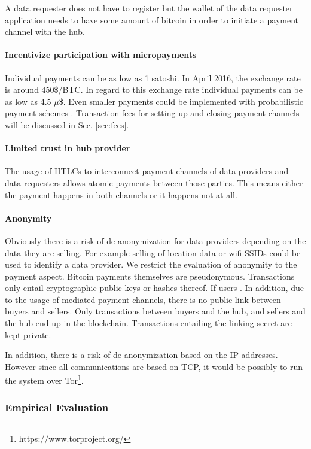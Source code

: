 A data requester does not have to register but the wallet of the data requester application needs to have some amount of bitcoin in order to initiate a payment channel with the hub.

\paragraph{Incentivize participation with micropayments}
Individual payments can be as low as 1 satoshi. In April 2016, the exchange rate is around 450\$/BTC. In regard to this exchange rate individual payments can be as low as 4.5 $\mu$\$. Even smaller payments could be implemented with probabilistic payment schemes \cite{Rivest1997,Pass:2015:MDC:2810103.2813713}. Transaction fees for setting up and closing payment channels will be discussed in Sec. \ref{sec:fees}. 

\paragraph{Limited trust in hub provider}
The usage of HTLCs to interconnect payment channels of data providers and data requesters allows atomic payments between those parties. This means either the payment happens in both channels or it happens not at all. 

\paragraph{Anonymity}
Obviously there is a risk of de-anonymization for data providers depending on the data they are selling. For example selling of location data or wifi SSIDs could be used to identify a data provider. We restrict the evaluation of anonymity to the payment aspect. Bitcoin payments themselves are pseudonymous. Transactions only entail cryptographic public keys or hashes thereof. If users . In addition, due to the usage of mediated payment channels, there is no public link between buyers and sellers. Only transactions between buyers and the hub, and sellers and the hub end up in the blockchain. Transactions entailing the linking secret are kept private. 

In addition, there is a risk of de-anonymization based on the IP addresses. However since all communications are based on TCP, it would be possibly to run the system over Tor\footnote{https://www.torproject.org/}.


\subsubsection{Empirical Evaluation}

